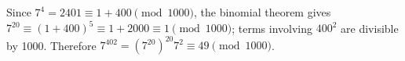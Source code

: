 Since $7^4=2401\equiv1+400\pmod{1000}$, the binomial theorem gives $7^{20}\equiv(1+400)^5\equiv1+2000\equiv1\pmod{1000}$; terms involving $400^2$ are divisible by 1000. Therefore $7^{402}=(7^{20})^{20}7^2\equiv\boxed{49}\pmod{1000}$.
